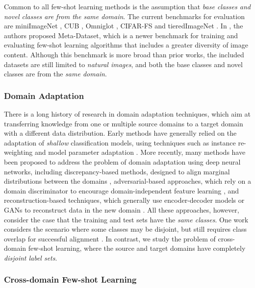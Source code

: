 \documentclass[runningheads]{llncs}
\begin{document}
Common to all few-shot learning methods is the assumption that {\em base classes and novel classes are from the same domain}. The current benchmarks for evaluation are miniImageNet \cite{vinyals2016matching}, CUB \cite{wah2011caltech}, Omniglot \cite{lake2011one}, CIFAR-FS \cite{bertinetto2018meta} and tieredImageNet \cite{ren2018meta}.  In \cite{triantafillou2019meta}, the authors proposed Meta-Dataset, which is a newer benchmark for training and evaluating few-shot learning algorithms that includes a greater diversity of image content. Although this benchmark is more broad than prior works, the included datasets are still limited to {\em natural images}, and both the base classes and novel classes are from the {\em same domain}. 


\subsubsection{Domain Adaptation}
There is a long history of research in domain adaptation techniques, which aim at transferring knowledge from one or multiple source domains to a target domain with a different data distribution. 
Early methods have generally relied on the adaptation of {\em shallow} classification models, using techniques such as instance re-weighting \cite{dudik2006correcting} and model parameter adaptation \cite{yang2007cross}. More recently, many methods have been proposed to address the problem of domain adaptation using deep neural networks, including discrepancy-based methods, designed to align marginal distributions between the domains \cite{long2017deep,sun2016return,kang2019contrastive,kumar2018co}, adversarial-based approaches, which rely on a domain discriminator to encourage domain-independent feature learning \cite{tzeng2017adversarial,ganin2016domain}, and reconstruction-based techniques, which generally use encoder-decoder models or GANs to reconstruct data in the new domain \cite{bousmalis2016domain,zhu2017unpaired,hoffman2017cycada}. All these approaches, however, consider the case that the training and test sets have the {\em same classes}. One work considers the scenario where some classes may be disjoint, but still requires class overlap for successful alignment \cite{saenko2}. In contrast, we study the problem of cross-domain few-shot learning, where the source and target domains have completely {\em disjoint label sets}. 




\subsubsection{Cross-domain Few-shot Learning}
\end{document}
